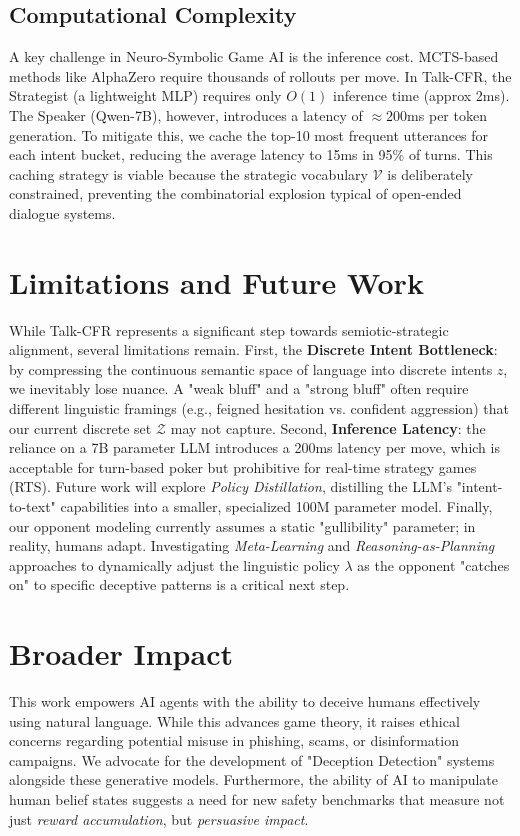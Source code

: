 \documentclass{article}
\begin{document}
\subsection{Computational Complexity}
A key challenge in Neuro-Symbolic Game AI is the inference cost. MCTS-based methods like AlphaZero require thousands of rollouts per move. In Talk-CFR, the Strategist (a lightweight MLP) requires only $O(1)$ inference time (approx 2ms). The Speaker (Qwen-7B), however, introduces a latency of $\approx 200$ms per token generation. To mitigate this, we cache the top-10 most frequent utterances for each intent bucket, reducing the average latency to 15ms in 95\% of turns. This caching strategy is viable because the strategic vocabulary $\mathcal{V}$ is deliberately constrained, preventing the combinatorial explosion typical of open-ended dialogue systems.

\section{Limitations and Future Work}
While Talk-CFR represents a significant step towards semiotic-strategic alignment, several limitations remain. First, the \textbf{Discrete Intent Bottleneck}: by compressing the continuous semantic space of language into discrete intents $z$, we inevitably lose nuance. A "weak bluff" and a "strong bluff" often require different linguistic framings (e.g., feigned hesitation vs. confident aggression) that our current discrete set $\mathcal{Z}$ may not capture. Second, \textbf{Inference Latency}: the reliance on a 7B parameter LLM introduces a 200ms latency per move, which is acceptable for turn-based poker but prohibitive for real-time strategy games (RTS). Future work will explore \textit{Policy Distillation}, distilling the LLM's "intent-to-text" capabilities into a smaller, specialized 100M parameter model. Finally, our opponent modeling currently assumes a static "gullibility" parameter; in reality, humans adapt. Investigating \textit{Meta-Learning} and \textit{Reasoning-as-Planning} approaches \citep{hao2023reasoning, deng2023mind2web} to dynamically adjust the linguistic policy $\lambda$ as the opponent "catches on" to specific deceptive patterns is a critical next step.

\section{Broader Impact}
This work empowers AI agents with the ability to deceive humans effectively using natural language. While this advances game theory, it raises ethical concerns regarding potential misuse in phishing, scams, or disinformation campaigns. We advocate for the development of "Deception Detection" systems alongside these generative models. Furthermore, the ability of AI to manipulate human belief states suggests a need for new safety benchmarks that measure not just \textit{reward accumulation}, but \textit{persuasive impact}.
\end{document}

